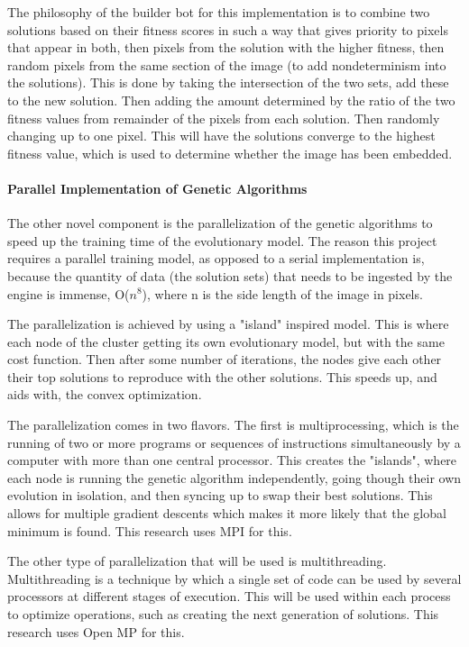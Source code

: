 \documentclass[12pt]{article}
\begin{document}
\par The philosophy of the builder bot for this implementation is to combine two solutions based on their fitness scores in such a way that gives priority to pixels that appear in both, then pixels from the solution with the higher fitness, then random pixels from the same section of the image (to add nondeterminism into the solutions). This is done by taking the intersection of the two sets, add these to the new solution. Then adding the amount determined by the ratio of the two fitness values from remainder of the pixels from each solution. Then randomly changing up to one pixel. This will have the solutions converge to the highest fitness value, which is used to determine whether the image has been embedded. 

\paragraph{Parallel Implementation of Genetic Algorithms}
\par The other novel component is the parallelization of the genetic
algorithms to speed up the training time of the evolutionary model. The reason this project requires a parallel training model, as opposed to a serial implementation is, because the quantity of data (the solution sets) that needs to be ingested by the engine is immense, O($n^8$), where n is the side length of the image in pixels.
\par The parallelization is achieved by using a "island" inspired model. This is where each node of the cluster getting its own evolutionary model, but with the same cost function. Then after some number of iterations, the nodes give each other their top solutions to reproduce with the other solutions. This speeds up, and aids with, the convex optimization.
\par The parallelization comes in two flavors. The first is multiprocessing, which is the running of two or more programs or sequences of instructions simultaneously by a computer with more than one central processor. This creates the "islands", where each node is running the genetic algorithm independently, going though their own evolution in isolation, and then syncing up to swap their best solutions. This allows for multiple gradient descents which makes it more likely that the global minimum is found. This research uses MPI for this.
\par The other type of parallelization that will be used is multithreading. Multithreading is a technique by which a single set of code can be used by several processors at different stages of execution. This will be used within each process to optimize operations, such as creating the next generation of solutions. This research uses Open MP for this. 
\end{document}
